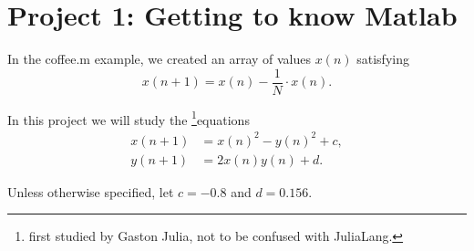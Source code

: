 \documentclass{exam}
\begin{document}
\section*{Project 1: Getting to know Matlab}
 


In the coffee.m example, we created an array of values $x(n)$ satisfying
\begin{equation}
x(n+1) = x(n)-\frac{1}{N}\cdot x(n).
\end{equation}

In this project we will study the \footnote{first studied by Gaston Julia, not to be confused with JuliaLang.}{equations}
\begin{align}
x(n+1) &= x(n)^2 - y(n)^2 + c,\\
y(n+1) &= 2x(n) y(n) + d.
\end{align} 

Unless otherwise specified, let $c= -0.8$ and $d =0.156$.
\end{document}
